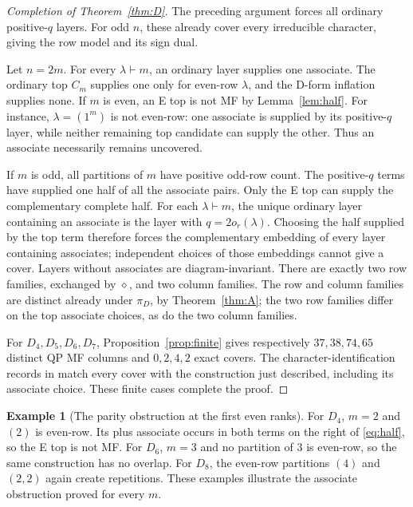\documentclass[11pt]{article}
\numberwithin{equation}{section}
\theoremstyle{definition}
\newtheorem{example}[theorem]{Example}
\newcommand{\diagauto}{\diamond}
\begin{document}
\begin{proof}[Completion of Theorem~\ref{thm:D}]
The preceding argument forces all ordinary positive-\(q\) layers.
For odd \(n\), these already cover every irreducible character, giving the row model and its sign dual.

Let \(n=2m\).
For every \(\lambda\vdash m\), an ordinary layer supplies one associate.
The ordinary top \(C_m\) supplies one only for even-row \(\lambda\), and the D-form inflation supplies none.
If \(m\) is even, an E top is not MF by Lemma~\ref{lem:half}.
For instance, \(\lambda=(1^m)\) is not even-row: one associate is supplied by its positive-\(q\) layer, while neither remaining top candidate can supply the other.
Thus an associate necessarily remains uncovered.

If \(m\) is odd, all partitions of \(m\) have positive odd-row count.
The positive-\(q\) terms have supplied one half of all the associate pairs.
Only the E top can supply the complementary complete half.
For each \(\lambda\vdash m\), the unique ordinary layer containing an associate is the layer with \(q=2o_r(\lambda)\).
Choosing the half supplied by the top term therefore forces the complementary embedding of every layer containing associates; independent choices of those embeddings cannot give a cover.
Layers without associates are diagram-invariant.
There are exactly two row families, exchanged by \(\diagauto\), and two column families.
The row and column families are distinct already under \(\pi_D\), by Theorem~\ref{thm:A}; the two row families differ on the top associate choices, as do the two column families.

For \(D_4,D_5,D_6,D_7\), Proposition~\ref{prop:finite} gives respectively \(37,38,74,65\) distinct QP MF columns and \(0,2,4,2\) exact covers.
The character-identification records in \cite{ZhangData} match every cover with the construction just described, including its associate choice.
These finite cases complete the proof.
\end{proof}

\begin{example}[The parity obstruction at the first even ranks]
For \(D_4\), \(m=2\) and \((2)\) is even-row.
Its plus associate occurs in both terms on the right of \eqref{eq:half}, so the E top is not MF.
For \(D_6\), \(m=3\) and no partition of \(3\) is even-row, so the same construction has no overlap.
For \(D_8\), the even-row partitions \((4)\) and \((2,2)\) again create repetitions.
These examples illustrate the associate obstruction proved for every \(m\).
\end{example}
\end{document}
